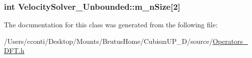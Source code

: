 \subsubsection[{m\+\_\+n\+Size}]{\setlength{\rightskip}{0pt plus 5cm}int Velocity\+Solver\+\_\+\+Unbounded\+::m\+\_\+n\+Size\mbox{[}2\mbox{]}\hspace{0.3cm}{\ttfamily [protected]}}\label{class_velocity_solver___unbounded_a5a06247f4313780a5cb906d64bcd8f80}


The documentation for this class was generated from the following file\+:\begin{DoxyCompactItemize}
\item 
/\+Users/cconti/\+Desktop/\+Mounts/\+Brutus\+Home/\+Cubism\+U\+P\+\_\+D/source/\hyperlink{_operators___d_f_t_8h}{Operators\+\_\+\+D\+F\+T.\+h}\end{DoxyCompactItemize}
